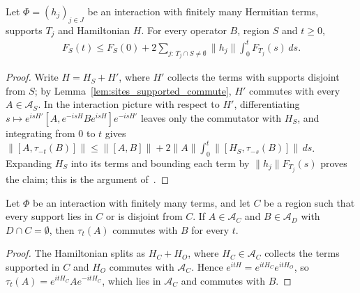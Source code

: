 \begin{theorem}
    \label{thm:dynamics_recursion}
    \leanok
    Let $\Phi=(h_j)_{j\in J}$ be an interaction with finitely many Hermitian
    terms, supports $T_j$ and Hamiltonian $H$. For every operator $B$, region
    $S$ and $t\geq0$,
    \begin{align*}
        F_S(t)\leq F_S(0)+2\sum_{j:\,T_j\cap S\neq\emptyset}
            \lVert h_j\rVert\int_0^tF_{T_j}(s)\,ds.
    \end{align*}
\end{theorem}
\begin{proof}\leanok
    Write $H=H_S+H'$, where $H'$ collects the terms with supports disjoint from
    $S$; by Lemma~\ref{lem:sites_supported_commute}, $H'$ commutes with every
    $A\in\mathcal A_S$. In the interaction picture with respect to $H'$,
    differentiating
    $s\mapsto e^{isH'}[A,e^{-isH}Be^{isH}]e^{-isH'}$ leaves only the
    commutator with $H_S$, and integrating from $0$ to $t$ gives
    $\lVert[A,\tau_{-t}(B)]\rVert\leq\lVert[A,B]\rVert+2\lVert A\rVert
    \int_0^t\lVert[H_S,\tau_{-s}(B)]\rVert\,ds$. Expanding $H_S$ into its terms
    and bounding each term by $\lVert h_j\rVert F_{T_j}(s)$ proves the claim;
    this is the argument of~\cite[Appendix~A]{HastingsKoma2006SpectralGap}.
\end{proof}

\begin{theorem}
    \label{thm:dynamics_closed_region}
    \leanok
    Let $\Phi$ be an interaction with finitely many terms, and let $C$ be a
    region such that every support lies in $C$ or is disjoint from $C$. If
    $A\in\mathcal A_C$ and $B\in\mathcal A_D$ with $D\cap C=\emptyset$, then
    $\tau_t(A)$ commutes with $B$ for every $t$.
\end{theorem}
\begin{proof}\leanok
    The Hamiltonian splits as $H_C+H_O$, where $H_C\in\mathcal A_C$ collects the
    terms supported in $C$ and $H_O$ commutes with $\mathcal A_C$. Hence
    $e^{itH}=e^{itH_C}e^{itH_O}$, so $\tau_t(A)=e^{itH_C}Ae^{-itH_C}$, which lies
    in $\mathcal A_C$ and commutes with $B$.
\end{proof}

